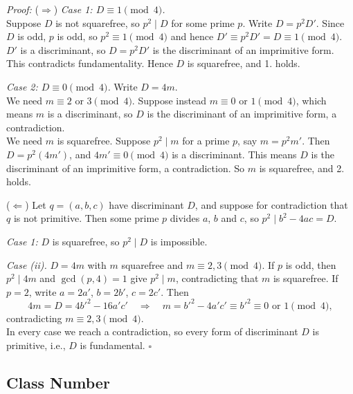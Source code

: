 \documentclass[a4paper,11pt,abstracton]{scrartcl}
\theoremstyle{dotlessP}
\theoremstyle{dotlessS}
\theoremstyle{remark}
\theoremstyle{definition}
\begin{document}
\begin{claim_box}
\textit{Proof:} ($\Rightarrow$)
\textit{Case 1: $D\equiv 1\pmod 4$.}
\\ Suppose $D$ is not squarefree, so $p^2\mid D$ for some prime $p$. Write
$D=p^2D'$. Since $D$ is odd, $p$ is odd, so $p^2\equiv 1\pmod 4$ and hence
$D'\equiv p^2D'=D\equiv 1\pmod 4$. $D'$ is a
discriminant, so $D=p^2D'$ is the discriminant of an
imprimitive form. This contradicts fundamentality. Hence $D$ is squarefree, and
1. holds.

\smallskip
\textit{Case 2: $D\equiv 0\pmod 4$.}
Write $D=4m$.
\\ We need $m\equiv 2$ or $3\pmod 4$. Suppose instead $m\equiv 0$ or
$1\pmod 4$, which means $m$ is a discriminant, so $D$
is the discriminant of an imprimitive
form, a contradiction. \\ We need $m$ is squarefree. Suppose $p^2\mid m$ for a prime $p$, say
$m=p^2m'$. Then $D=p^2(4m')$, and $4m'\equiv 0\pmod 4$ is a discriminant. This means $D$ is the discriminant of an
imprimitive form, a contradiction. So $m$ is squarefree, and 2. holds.

\medskip
($\Leftarrow$)
Let $q=(a,b,c)$ have discriminant $D$, and suppose for contradiction that
$q$ is not primitive. Then some prime $p$ divides $a$, $b$ and $c$, so
$p^2\mid b^2-4ac=D$.

\smallskip
\textit{Case 1:} $D$ is squarefree, so $p^2\mid D$ is impossible.

\smallskip
\noindent\textit{Case (ii).} $D=4m$ with $m$ squarefree and $m\equiv 2,3\pmod 4$. If $p$ is odd, then $p^2\mid 4m$ and $\gcd(p,4)=1$ give $p^2\mid m$,
contradicting that $m$ is squarefree. If $p=2$, write $a=2a'$, $b=2b'$, $c=2c'$. Then
        \[
          4m=D=4b'^2-16a'c' \quad\Longrightarrow\quad m=b'^2-4a'c'\equiv b'^2\equiv 0\text{ or }1\pmod 4,
        \]
        contradicting $m\equiv 2,3\pmod 4$. \\ In every case we reach a contradiction, so every form of discriminant $D$ is
primitive, i.e., $D$ is fundamental.
\hfill$\square$
\end{claim_box}

\subsection{Class Number}
\end{document}
